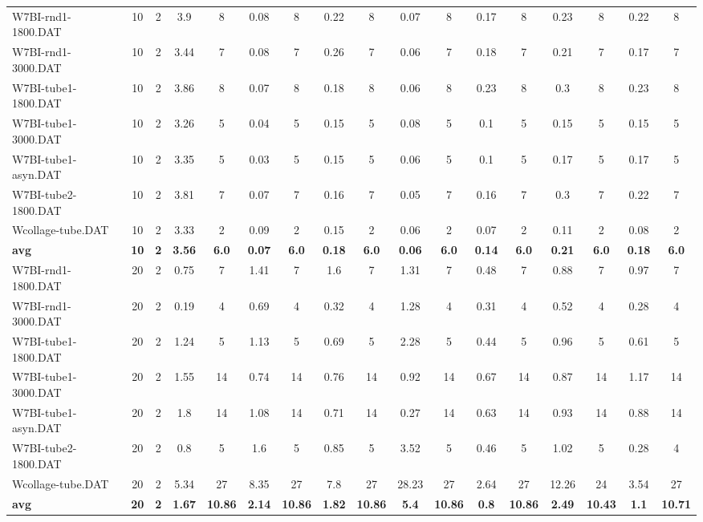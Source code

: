 \begin{table}[!ht]
{\begin{tabular}{lcccccccccccccccc}
W7BI-rnd1-1800.DAT & 10 & 2 & 3.9 & 8 & 0.08 & 8 & 0.22 & 8 & 0.07 & 8 & 0.17 & 8 & 0.23 & 8 & 0.22 & 8 \\
W7BI-rnd1-3000.DAT & 10 & 2 & 3.44 & 7 & 0.08 & 7 & 0.26 & 7 & 0.06 & 7 & 0.18 & 7 & 0.21 & 7 & 0.17 & 7 \\
W7BI-tube1-1800.DAT & 10 & 2 & 3.86 & 8 & 0.07 & 8 & 0.18 & 8 & 0.06 & 8 & 0.23 & 8 & 0.3 & 8 & 0.23 & 8 \\
W7BI-tube1-3000.DAT & 10 & 2 & 3.26 & 5 & 0.04 & 5 & 0.15 & 5 & 0.08 & 5 & 0.1 & 5 & 0.15 & 5 & 0.15 & 5 \\
W7BI-tube1-asyn.DAT & 10 & 2 & 3.35 & 5 & 0.03 & 5 & 0.15 & 5 & 0.06 & 5 & 0.1 & 5 & 0.17 & 5 & 0.17 & 5 \\
W7BI-tube2-1800.DAT & 10 & 2 & 3.81 & 7 & 0.07 & 7 & 0.16 & 7 & 0.05 & 7 & 0.16 & 7 & 0.3 & 7 & 0.22 & 7 \\
Wcollage-tube.DAT & 10 & 2 & 3.33 & 2 & 0.09 & 2 & 0.15 & 2 & 0.06 & 2 & 0.07 & 2 & 0.11 & 2 & 0.08 & 2 \\
\cline{1-17} \textbf{avg} & \textbf{10} & \textbf{2} & \textbf{3.56} & \textbf{6.0} & \textbf{0.07} & \textbf{6.0} & \textbf{0.18} & \textbf{6.0} & \textbf{0.06} & \textbf{6.0} & \textbf{0.14} & \textbf{6.0} & \textbf{0.21} & \textbf{6.0} & \textbf{0.18} & \textbf{6.0} \\ \cline{1-17}
W7BI-rnd1-1800.DAT & 20 & 2 & 0.75 & 7 & 1.41 & 7 & 1.6 & 7 & 1.31 & 7 & 0.48 & 7 & 0.88 & 7 & 0.97 & 7 \\
W7BI-rnd1-3000.DAT & 20 & 2 & 0.19 & 4 & 0.69 & 4 & 0.32 & 4 & 1.28 & 4 & 0.31 & 4 & 0.52 & 4 & 0.28 & 4 \\
W7BI-tube1-1800.DAT & 20 & 2 & 1.24 & 5 & 1.13 & 5 & 0.69 & 5 & 2.28 & 5 & 0.44 & 5 & 0.96 & 5 & 0.61 & 5 \\
W7BI-tube1-3000.DAT & 20 & 2 & 1.55 & 14 & 0.74 & 14 & 0.76 & 14 & 0.92 & 14 & 0.67 & 14 & 0.87 & 14 & 1.17 & 14 \\
W7BI-tube1-asyn.DAT & 20 & 2 & 1.8 & 14 & 1.08 & 14 & 0.71 & 14 & 0.27 & 14 & 0.63 & 14 & 0.93 & 14 & 0.88 & 14 \\
W7BI-tube2-1800.DAT & 20 & 2 & 0.8 & 5 & 1.6 & 5 & 0.85 & 5 & 3.52 & 5 & 0.46 & 5 & 1.02 & 5 & 0.28 & 4 \\
Wcollage-tube.DAT & 20 & 2 & 5.34 & 27 & 8.35 & 27 & 7.8 & 27 & 28.23 & 27 & 2.64 & 27 & 12.26 & 24 & 3.54 & 27 \\
\cline{1-17} \textbf{avg} & \textbf{20} & \textbf{2} & \textbf{1.67} & \textbf{10.86} & \textbf{2.14} & \textbf{10.86} & \textbf{1.82} & \textbf{10.86} & \textbf{5.4} & \textbf{10.86} & \textbf{0.8} & \textbf{10.86} & \textbf{2.49} & \textbf{10.43} & \textbf{1.1} & \textbf{10.71} \\ \cline{1-17}

\end{tabular}}
\end{table}
